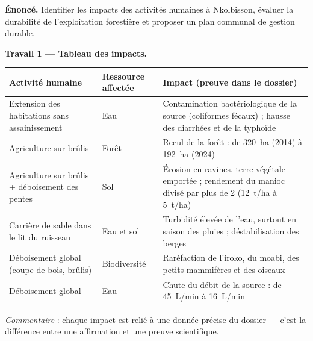 \documentclass[11pt]{article}
\begin{document}
\begin{exoresolu}
\textbf{Énoncé.} Identifier les impacts des activités humaines à Nkolbisson, évaluer la durabilité de l'exploitation forestière et proposer un plan communal de gestion durable.

\tcblower

\textbf{Travail 1 — Tableau des impacts.}

\begin{center}
\begin{tabularx}{\linewidth}{|X|l|X|}
\hline
\rowcolor{popgreen!40} \textbf{Activité humaine} & \textbf{Ressource affectée} & \textbf{Impact (preuve dans le dossier)} \\
\hline
Extension des habitations sans assainissement & Eau & Contamination bactériologique de la source (coliformes fécaux) ; hausse des diarrhées et de la typhoïde \\
\hline
Agriculture sur brûlis & Forêt & Recul de la forêt : de \SI{320}{ha} (2014) à \SI{192}{ha} (2024) \\
\hline
Agriculture sur brûlis + déboisement des pentes & Sol & Érosion en ravines, terre végétale emportée ; rendement du manioc divisé par plus de 2 (\SI{12}{t/ha} à \SI{5}{t/ha}) \\
\hline
Carrière de sable dans le lit du ruisseau & Eau et sol & Turbidité élevée de l'eau, surtout en saison des pluies ; déstabilisation des berges \\
\hline
Déboisement global (coupe de bois, brûlis) & Biodiversité & Raréfaction de l'iroko, du moabi, des petits mammifères et des oiseaux \\
\hline
Déboisement global & Eau & Chute du débit de la source : de \SI{45}{L/min} à \SI{16}{L/min} \\
\hline
\end{tabularx}
\end{center}

\emph{Commentaire} : chaque impact est relié à une donnée précise du dossier — c'est la différence entre une affirmation et une preuve scientifique.


\end{exoresolu}
\end{document}
